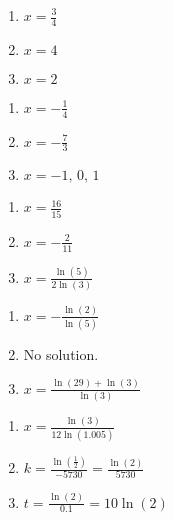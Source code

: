 \begin{multicols}{3}
\begin{enumerate}

\item $x = \frac{3}{4}$
\item $x = 4$
\item $x=2$

\setcounter{HW}{\value{enumi}}
\end{enumerate}
\end{multicols}

\begin{multicols}{3}
\begin{enumerate}
\setcounter{enumi}{\value{HW}}

\item $x = -\frac{1}{4}$
\item $x = -\frac{7}{3}$
\item $x = -1, \, 0, \, 1$

\setcounter{HW}{\value{enumi}}
\end{enumerate}
\end{multicols}

\begin{multicols}{3}
\begin{enumerate}
\setcounter{enumi}{\value{HW}}

\item $x = \frac{16}{15}$
\item $x=-\frac{2}{11}$
\item $x = \frac{\ln(5)}{2\ln(3)}$

\setcounter{HW}{\value{enumi}}
\end{enumerate}
\end{multicols}

\begin{multicols}{3}
\begin{enumerate}
\setcounter{enumi}{\value{HW}}

\item $x = -\frac{\ln(2)}{\ln(5)}$
\item No solution.
\item $x = \frac{\ln(29) + \ln(3)}{\ln(3)}$

\setcounter{HW}{\value{enumi}}
\end{enumerate}
\end{multicols}

\begin{multicols}{3}
\begin{enumerate}
\setcounter{enumi}{\value{HW}}

\item $x = \frac{\ln(3)}{12\ln(1.005)}$
\item $k = \frac{\ln\left(\frac{1}{2}\right)}{-5730} = \frac{\ln(2)}{5730} $
\item $t=\frac{\ln(2)}{0.1} = 10\ln(2)$

\setcounter{HW}{\value{enumi}}
\end{enumerate}
\end{multicols}

